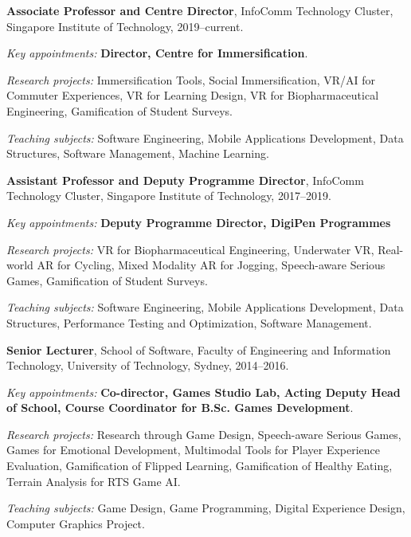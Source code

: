 \documentclass[10pt,a4paper]{article}
\renewenvironment{itemize}{
    \begin{list}{}{
            \setlength{\leftmargin}{1.5em}
            \setlength{\itemsep}{0.25em}
            \setlength{\parskip}{0pt}
            \setlength{\parsep}{0.25em}
        }
        }{
    \end{list}
}
\begin{document}
\begin{itemize}
    \item \textbf{Associate Professor and Centre Director}, InfoComm Technology Cluster, Singapore Institute of Technology,
        2019--current.
        \begin{itemize}
            \item \textit{Key appointments:} \textbf{Director, Centre for Immersification}.
            \item \textit{Research projects:} Immersification Tools, Social Immersification, VR/AI for Commuter Experiences, VR for Learning Design, VR for Biopharmaceutical Engineering, Gamification of Student Surveys.
            \item \textit{Teaching subjects:} Software Engineering, Mobile Applications Development, Data Structures, Software Management, Machine Learning.
        \end{itemize}

    \item \textbf{Assistant Professor and Deputy Programme Director}, InfoComm Technology Cluster, Singapore Institute of Technology,
        2017--2019.
        \begin{itemize}
            \item \textit{Key appointments:} \textbf{Deputy Programme Director, DigiPen Programmes} 
            \item \textit{Research projects:} VR for Biopharmaceutical Engineering, Underwater VR, Real-world AR for Cycling, Mixed Modality AR for Jogging, Speech-aware Serious Games, Gamification of Student Surveys.
            \item \textit{Teaching subjects:} Software Engineering, Mobile Applications Development, Data Structures, Performance Testing and Optimization, Software Management.
        \end{itemize}

    \item \textbf{Senior Lecturer}, School of Software, Faculty of Engineering and Information Technology, University of Technology, Sydney,
        2014--2016.
        \begin{itemize}
            \item \textit{Key appointments:} \textbf{Co-director, Games Studio Lab, \textbf{Acting Deputy Head of School}, Course Coordinator for B.Sc. Games Development}.
            \item \textit{Research projects:} Research through Game Design, Speech-aware Serious Games, Games for Emotional Development, Multimodal Tools for Player Experience Evaluation, Gamification of Flipped Learning, Gamification of Healthy Eating, Terrain Analysis for RTS Game AI.
            \item \textit{Teaching subjects:} Game Design, Game Programming, Digital Experience Design, Computer Graphics Project.
        \end{itemize}


\end{itemize}
\end{document}
